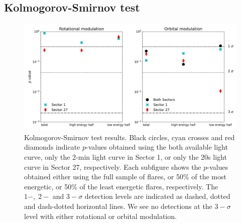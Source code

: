 \documentclass[fleqn,usenatbib,letters]{mnras}%
\begin{document}
\subsection{Kolmogorov-Smirnov test}
\label{sec:phases}
\begin{figure}
\includegraphics[width=\hsize]{figures/2021_06_02_AUMic_KStests_meta.png} 
\caption{Kolmogorov-Smirnov test results. Black circles, cyan crosses and red diamonds indicate $p$-values obtained using the both available light curve, only the 2-min light curve in Sector 1, or only the 20s light curve in Sector 27, respectively. Each subfigure shows the $p$-values obtained either using the full sample of flares, or 50\% of the most energetic, or 50\% of the least energetic flares, respectively. The $1-,\;2-$ and $3-\sigma$ detection levels are indicated as dashed, dotted and dash-dotted horizontal lines. We see no detections at the $3-\sigma$ level with either rotational or orbital modulation.}
\label{fig:kstests}
\end{figure}
\end{document}
